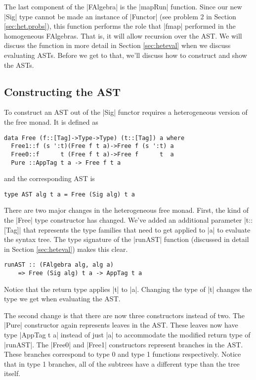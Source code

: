 \documentclass[preprint]{sigplanconf}
\theoremstyle{definition}
\begin{document}
The last component of the |FAlgebra| is the |mapRun| function.
Since our new |Sig| type cannot be made an instance of |Functor|
(see problem 2 in Section \ref{sec:het.probs}),
this function performs the role that |fmap| performed in the homogeneous FAlgebras.
That is, it will allow recursion over the AST.
We will discuss the function in more detail in Section \ref{sec:heteval} when we discuss evaluating ASTs.
Before we get to that,
we'll discuss how to construct and show the ASTs.

\subsection{Constructing the AST}

To construct an AST out of the |Sig| functor requires a heterogeneous version of the free monad.
It is defined as
\begin{lstlisting}
data Free (f::[Tag]->Type->Type) (t::[Tag]) a where
  Free1::f (s ':t)(Free f t a)->Free f (s ':t) a
  Free0::f      t (Free f t a)->Free f      t  a
  Pure ::AppTag t a -> Free f t a
\end{lstlisting}
and the corresponding AST is
\begin{lstlisting}
type AST alg t a = Free (Sig alg) t a
\end{lstlisting}
There are two major changes in the heterogeneous free monad.
First, the kind of the |Free| type constructor has changed.
We've added an additional parameter |t::[Tag]| that represents the type families that need to get applied to |a| to evaluate the syntax tree.
The type signature of the |runAST| function (discussed in detail in Section \ref{sec:heteval}) makes this clear.
\begin{lstlisting}
runAST :: (FAlgebra alg, alg a)
    => Free (Sig alg) t a -> AppTag t a
\end{lstlisting}
Notice that the return type applies |t| to |a|.
Changing the type of |t| changes the type we get when evaluating the AST.

The second change is that there are now three constructors instead of two.
The |Pure| constructor again represents leaves in the AST.
These leaves now have type |AppTag t a| instead of just |a| to accommodate the modified return type of |runAST|.
The |Free0| and |Free1| constructors represent branches in the AST.
These branches correspond to type 0 and type 1 functions respectively.
Notice that in type 1 branches, all of the subtrees have a different type than the tree itself.
\end{document}
